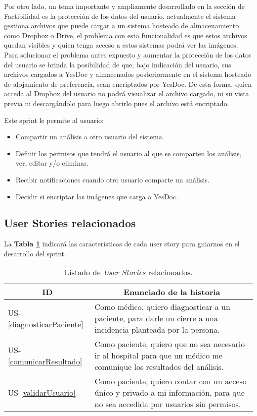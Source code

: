   Por otro lado, un tema importante y ampliamente desarrollado en la sección de Factibilidad es la protección de los datos del usuario, actualmente el sistema gestiona archivos que puede cargar a un sistema hosteado de almacenamiento como Dropbox o Drive, el problema con esta funcionalidad es que estos archivos quedan visibles y quien tenga acceso a estos sistemas podrá ver las imágenes. Para solucionar el problema antes expuesto y aumentar la protección de los datos del usuario se brinda la posibilidad de que, bajo indicación del usuario, sus archivos cargados a YesDoc y almacenados posteriormente en el sistema hosteado de alojamiento de preferencia, sean encriptados por YesDoc. De esta forma, quien acceda al Dropbox del usuario no podrá visualizar el archivo cargado, ni su vista previa ni descargándolo para luego abrirlo pues el archivo está encriptado. 

Este sprint le permite al usuario:
	\begin{itemize}
		\item Compartir un análisis a otro usuario del sistema.
		\item Definir los permisos que tendrá el usuario al que se comparten los análisis, ver, editar y/o eliminar.
		\item Recibir notificaciones cuando otro usuario comparte un análisis.  
		\item Decidir si encriptar las imágenes que carga a YesDoc.
	\end{itemize}
	
\subsection{User Stories relacionados}
La \textbf{Tabla \ref{US-Sprint8}} indicará las características de cada user story para guiarnos en el desarrollo del sprint.

\newpage

\begin{table}[h]
	\centering
	\begin{tabular}{|l|p{9cm}|}
		\hline
		\multicolumn{1}{|c|}{\textbf{ID}} &
		\multicolumn{1}{|c|}{\textbf{Enunciado de la historia}} \\  
		\hline
		US-\ref{diagnosticarPaciente} &
		Como médico, quiero diagnosticar a un paciente, para darle un cierre a una incidencia planteada por la persona. \\ 
		\hline
		US-\ref{comunicarResultado} &
		Como paciente, quiero que no sea necesario ir al hospital para que un médico me comunique los resultados del análisis. \\       
		\hline
		US-\ref{validarUsuario} &
		Como paciente, quiero contar con un acceso único y privado a mi información, para que no sea accedida por usuarios sin permisos. \\
		\hline
	\end{tabular}
	\caption{Listado de \textit{User Stories} relacionados.}
	\label{US-Sprint8}
\end{table}

